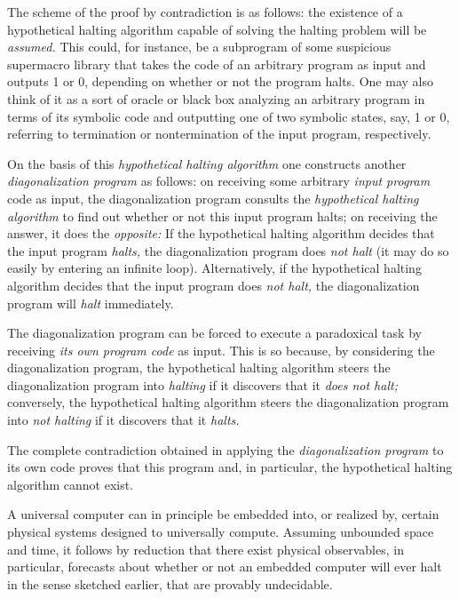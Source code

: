 {\color{OliveGreen}
\bproof
The scheme of the proof by contradiction is as follows:
the existence of a hypothetical halting algorithm
capable of solving the halting problem will be {\em assumed.}
This could, for instance, be a subprogram of some suspicious supermacro library
that takes the code of an arbitrary program as input and outputs 1 or 0,
depending on whether or not the program halts.
One may also think of it as a sort of oracle or black box analyzing an arbitrary
program in terms of its symbolic code and outputting one of two symbolic states, say, 1 or 0,
referring to termination or nontermination of the input program, respectively.

On the basis of this {\em hypothetical halting algorithm}
one constructs another {\em diagonalization program} as follows:
on receiving some arbitrary {\em input program} code as input, the {diagonalization program}
consults the {\em hypothetical halting algorithm} to find out whether or not this
{input program} halts; on receiving the answer, it does the {\em opposite:}
If  the   hypothetical halting algorithm  decides that the   input program  {\em halts,}
the   diagonalization program  does {\em not halt} (it may do so easily by entering an infinite loop).
Alternatively, if  the   hypothetical halting algorithm  decides that the  input program  does {\em not halt,}
the {diagonalization program} will {\em halt} immediately.

The {diagonalization program} can be forced to execute a paradoxical task by
receiving {\em its own program code} as input.
This is so because, by considering the {diagonalization program,}
the {hypothetical halting algorithm} steers the {diagonalization program} into
{\em halting} if it discovers that it {\em does not halt;}
conversely,  the {hypothetical halting algorithm} steers the {diagonalization program} into
{\em not halting} if it discovers that it {\em halts.}

The complete contradiction obtained in applying the {\em  diagonalization program} to its own code proves that this program
and, in particular, the {hypothetical halting algorithm} cannot exist.
\eproof
}


A universal computer
can in principle be embedded into, or realized by, certain physical systems designed to universally compute.
Assuming unbounded space and time,
it follows by
reduction
that there exist physical observables,
in particular, forecasts about whether or not an embedded computer will ever
halt in the sense sketched earlier,
that are provably undecidable.



